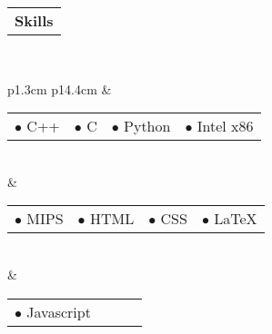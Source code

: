 \documentclass[12pt]{article}
\begin{document}
 \raggedright{\begin{tabular}[b]{p{5.5cm}}
	\bf{\Large{Skills}} \\
    \cline{1-1}
\end{tabular}} \\ \smallskip \smallskip \smallskip \smallskip \smallskip
\begin{tabular}[b]{p{1.3cm} p{14.4cm}}
	&\begin{tabular}[b]{p{2.8cm} p{2.8cm} p{2.8cm} p{2.8cm}}
    $\bullet$ C++ & $\bullet$ C & $\bullet$ Python & $\bullet$ Intel x86
    \end{tabular} \medskip \\
    &\begin{tabular}[b]{p{2.8cm} p{2.8cm} p{2.8cm} p{2.8cm}}
    $\bullet$ MIPS & $\bullet$ HTML & $\bullet$ CSS & $\bullet$ \LaTeX
    \end{tabular} \medskip \\
    &\begin{tabular}[b]{p{2.8cm} p{2.8cm} p{2.8cm} p{2.8cm}}
    $\bullet$ Javascript
    \end{tabular} \\
\end{tabular}\\
\end{document}
